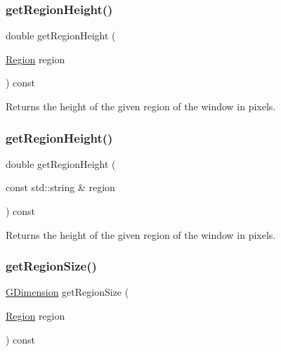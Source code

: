\subsubsection{\texorpdfstring{get\+Region\+Height()}{getRegionHeight()}\hspace{0.1cm}{\footnotesize\ttfamily [1/2]}}
{\footnotesize\ttfamily double get\+Region\+Height (\begin{DoxyParamCaption}\item[{\mbox{\hyperlink{classGWindow_a81a01a86de31071a92e6cce0bab9bc4b}{Region}}}]{region }\end{DoxyParamCaption}) const\hspace{0.3cm}{\ttfamily [virtual]}}



Returns the height of the given region of the window in pixels. 

\mbox{\label{classGWindow_ae8a545e772745b89edaf9804a2dc0057}} 
\subsubsection{\texorpdfstring{get\+Region\+Height()}{getRegionHeight()}\hspace{0.1cm}{\footnotesize\ttfamily [2/2]}}
{\footnotesize\ttfamily double get\+Region\+Height (\begin{DoxyParamCaption}\item[{const std\+::string \&}]{region }\end{DoxyParamCaption}) const\hspace{0.3cm}{\ttfamily [virtual]}}



Returns the height of the given region of the window in pixels. 

\mbox{\label{classGWindow_a3b5db9ffbd4b32260f80634f162dba4e}} 
\subsubsection{\texorpdfstring{get\+Region\+Size()}{getRegionSize()}\hspace{0.1cm}{\footnotesize\ttfamily [1/2]}}
{\footnotesize\ttfamily \mbox{\hyperlink{classGDimension}{G\+Dimension}} get\+Region\+Size (\begin{DoxyParamCaption}\item[{\mbox{\hyperlink{classGWindow_a81a01a86de31071a92e6cce0bab9bc4b}{Region}}}]{region }\end{DoxyParamCaption}) const\hspace{0.3cm}{\ttfamily [virtual]}}



